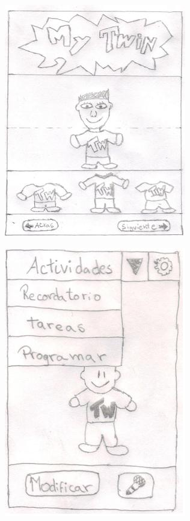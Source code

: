 \documentclass[12pt]{article}
\begin{document}
{{{\begin{flushleft}
\begin{center}
\hspace{0.3in}\includegraphics[scale=0.65]{imagenes_android/Twin2}\vspace{0.1in}
\end{center}
\begin{center}
\includegraphics[scale=0.6]{imagenes_android/Twin3}
\end{center}


\end{flushleft}


\newpage
\begin{flushleft}

\end{flushleft}}}}
\end{document}
